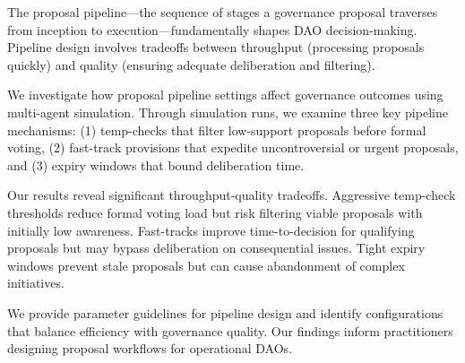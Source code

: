 
The proposal pipeline---the sequence of stages a governance proposal traverses from inception to execution---fundamentally shapes DAO decision-making. Pipeline design involves tradeoffs between throughput (processing proposals quickly) and quality (ensuring adequate deliberation and filtering).

We investigate how proposal pipeline settings affect governance outcomes using multi-agent simulation. Through \experimentruns{} simulation runs, we examine three key pipeline mechanisms: (1) temp-checks that filter low-support proposals before formal voting, (2) fast-track provisions that expedite uncontroversial or urgent proposals, and (3) expiry windows that bound deliberation time.

Our results reveal significant throughput-quality tradeoffs. Aggressive temp-check thresholds reduce formal voting load but risk filtering viable proposals with initially low awareness. Fast-tracks improve time-to-decision for qualifying proposals but may bypass deliberation on consequential issues. Tight expiry windows prevent stale proposals but can cause abandonment of complex initiatives.

We provide parameter guidelines for pipeline design and identify configurations that balance efficiency with governance quality. Our findings inform practitioners designing proposal workflows for operational DAOs.

